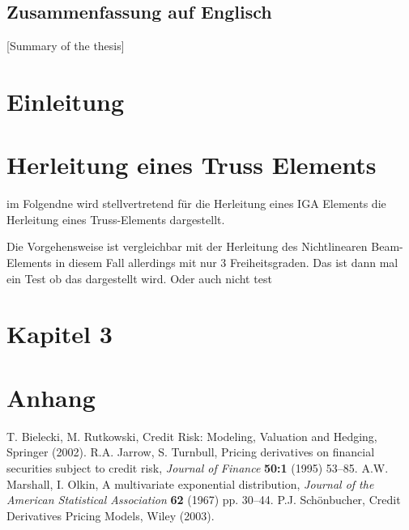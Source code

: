 \documentclass[german,a4paper,12pt,oneside]{scrbook}
\theoremstyle{definition}
\theoremstyle{definition}
\theoremstyle{definition}
\theoremstyle{definition}
\theoremstyle{definition}
\theoremstyle{definition}
\begin{document}
\section*{Zusammenfassung auf Englisch}
[Summary of the thesis]
\newpage
\tableofcontents  


\chapter{Einleitung}  \setcounter{page}{1}   %

\chapter{Herleitung eines Truss Elements}

im Folgendne wird stellvertretend für die Herleitung eines IGA Elements die Herleitung eines Truss-Elements 
dargestellt. 

Die Vorgehensweise ist vergleichbar mit der Herleitung des Nichtlinearen Beam-Elements in diesem Fall 
allerdings mit nur 3 Freiheitsgraden.
Das ist dann mal ein Test ob das dargestellt wird. Oder auch nicht test








\chapter{Kapitel 3}
\chapter{Anhang}
\begin{thebibliography}{XX}
T. Bielecki, M. Rutkowski, Credit Risk: Modeling, Valuation and Hedging, Springer (2002).
 R.A. Jarrow, S. Turnbull, Pricing derivatives on financial securities subject to credit risk, {\it Journal of Finance} {\bf 50:1} (1995) 53--85.
 A.W. Marshall, I. Olkin, A multivariate exponential distribution, {\it Journal of the American Statistical Association} {\bf 62} (1967) pp. 30--44.
 P.J. Sch\"onbucher, Credit Derivatives Pricing Models, Wiley (2003).\end{thebibliography}
\end{document}

